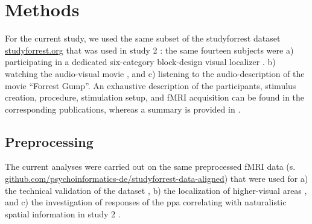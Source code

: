 \section{Methods}



For the current study, we used the same subset of the studyforrest dataset
\href{http://www.studyforrest.org}{studyforrest.org} that was used in study 2
\citep{haeusler2022processing}:
%
the same fourteen subjects were
a) participating in a dedicated six-category block-design visual localizer
\citep{sengupta2016extension}.
b) watching the audio-visual movie \citep{hanke2016simultaneous}, and
c) listening to the audio-description \citep{hanke2014audiomovie} of the movie
``Forrest Gump''.
An exhaustive description of the participants, stimulus creation, procedure,
stimulation setup, and fMRI acquisition can be found in the corresponding
publications, whereas a summary is provided in \citet{haeusler2022processing}.


\subsection{Preprocessing}

The current analyses were carried out on the same preprocessed fMRI data (s.
\href{https://github.com/psychoinformatics-de/studyforrest-data-aligned
}{\url{github.com/psychoinformatics-de/studyforrest-data-aligned}}) that were
used for
%
a) the technical validation of the dataset \citep{hanke2016simultaneous},
%
b) the localization of higher-visual areas \citep{sengupta2016extension}, and
%
c) the investigation of responses of the \ac{ppa} correlating with naturalistic
spatial information in study 2 \citep{haeusler2022processing}.

